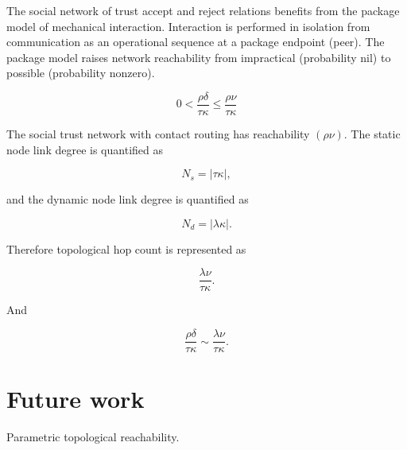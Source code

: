 \documentclass[12pt,twocolumn]{article}
\begin{document}
The social network of trust accept and reject relations benefits from
the package model of mechanical interaction.  Interaction is performed
in isolation from communication as an operational sequence at a
package endpoint (peer).  The package model raises network
reachability from impractical (probability nil) to possible
(probability nonzero).


$$
 0 < \frac{\rho\delta}{\tau\kappa} \le \frac{\rho\nu}{\tau\kappa}
$$

The social trust network with contact routing has reachability
\((\rho\nu)\).  The static node link degree is quantified as

$$
 N_s = | \tau\kappa | ,
$$

and the dynamic node link degree is quantified as
 
$$
 N_d = | \lambda\kappa | .
$$

Therefore topological hop count is represented as

$$
 \frac{\lambda\nu}{\tau\kappa} .
$$

And

$$
 \frac{\rho\delta}{\tau\kappa} \sim \frac{\lambda\nu}{\tau\kappa} .
$$

\section{Future work}

Parametric topological reachability.


\appendix




\end{document}
